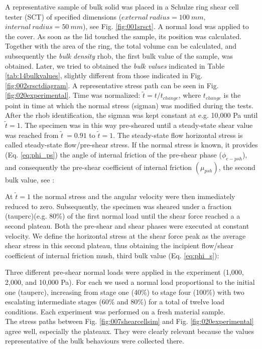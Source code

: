 

A representative sample of bulk solid was placed in a Schulze ring shear cell
tester (\acs{SCT}) of specified dimensions ($external ~ radius = 100 ~ mm$,
$internal ~ radius = 50 ~ mm$), see Fig. \ref{fig:001srsct}.
A normal load was applied to the cover. As soon as the lid touched the sample,
its position was calculated.
Together with the area of the ring, the total volume can be calculated, and subsequently the 
\textit{bulk density} \acs{rhob}, the first bulk value
of the sample, was obtained.
Later, we tried to obtained the \textit{bulk values} indicated in Table
\ref{tab:14bulkvalues}, slightly different from those indicated in Fig.
\ref{fig:002srsctdiagram}.
A representative stress path can be seen in Fig. \ref{fig:020experimental}.
Time was normalized: $\tilde{t} = t/t_{change}$, where $t_{change}$ is the
point in time at which the normal stress (\acs{sigman}) was modified during the	tests.
After the \acs{rhob} identification, the \acs{sigman} was kept constant at e.g.
10,000 Pa until $\tilde{t}=1$.
The specimen was in this way pre-sheared until a steady-state shear value was
reached from $\tilde{t}~=0.91$ to $\tilde{t}=1$.
The steady-state flow horizontal stress
is called steady-state flow/pre-shear stress.
If the normal stress is known, it provides (Eq. \ref{eq:phi_ps}) the angle of
internal friction of the pre-shear phase ($\phi_{e-psh}$), and consequently the
pre-shear coefficient of internal friction $ (\mu_{psh})$, the second
bulk value, see \citet{RefWorks:118}:

At $\tilde{t}=1$ the normal stress and the angular velocity were then
immediately reduced to zero.
Subsequently, the specimen was sheared under a fraction (\acs{tauperc})(e.g.
80\%) of the first normal load until the shear force reached a a second plateau.
Both the pre-shear and shear phases were executed at constant velocity. 
We define the horizontal stress at the shear force peak as the average shear
stress in this second plateau, thus obtaining the incipient flow/shear
coefficient of internal friction \acs{mush}, third bulk value (Eq. \ref{eq:phi_s})\cite{RefWorks:118}:

Three different pre-shear normal loads were applied in the experiment
(1,000, 2,000, and 10,000 Pa).
For each we used a normal load proportional to the initial one
(\acs{tauperc}), increasing from stage one (40\%) to stage four (100\%)
with two escalating intermediate stages (60\% and 80\%) for a total of twelve load conditions.
Each experiment was performed on a fresh material sample. \\

The stress paths between Fig. \ref{fig:007shearcellsim} and Fig.
\ref{fig:020experimental} agree well, especially the plateaux.
They were clearly relevant because
the values representative of the bulk behaviours were collected there.

